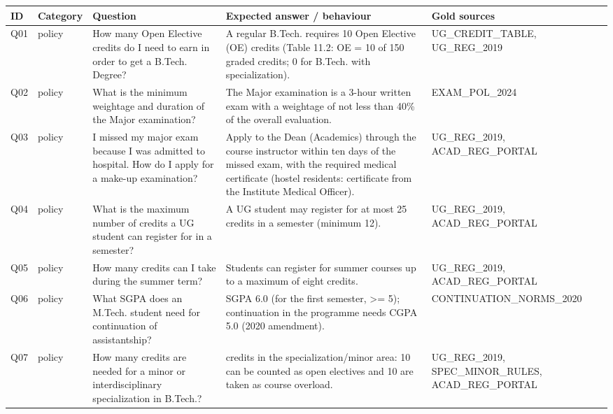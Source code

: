 \begin{small}
\begin{longtable}{>{\raggedright\arraybackslash}p{0.6cm}>{\raggedright\arraybackslash}p{1.4cm}>{\raggedright\arraybackslash}p{4.3cm}>{\raggedright\arraybackslash}p{5.6cm}>{\raggedright\arraybackslash}p{2.3cm}}
\toprule
ID & Category & Question & Expected answer / behaviour & Gold sources \\
\midrule
\endhead
Q01 & policy & How many Open Elective credits do I need to earn in order to get a B.Tech. Degree? & A regular B.Tech. requires 10 Open Elective (OE) credits (Table 11.2: OE = 10 of 150 graded credits; 0 for B.Tech. with specialization). & UG\_\allowbreak{}CREDIT\_\allowbreak{}TABLE, UG\_\allowbreak{}REG\_\allowbreak{}2019 \\
Q02 & policy & What is the minimum weightage and duration of the Major examination? & The Major examination is a 3-hour written exam with a weightage of not less than 40\% of the overall evaluation. & EXAM\_\allowbreak{}POL\_\allowbreak{}2024 \\
Q03 & policy & I missed my major exam because I was admitted to hospital. How do I apply for a make-up examination? & Apply to the Dean (Academics) through the course instructor within ten days of the missed exam, with the required medical certificate (hostel residents: certificate from the Institute Medical Officer). & UG\_\allowbreak{}REG\_\allowbreak{}2019, ACAD\_\allowbreak{}REG\_\allowbreak{}PORTAL \\
Q04 & policy & What is the maximum number of credits a UG student can register for in a semester? & A UG student may register for at most 25 credits in a semester (minimum 12). & UG\_\allowbreak{}REG\_\allowbreak{}2019, ACAD\_\allowbreak{}REG\_\allowbreak{}PORTAL \\
Q05 & policy & How many credits can I take during the summer term? & Students can register for summer courses up to a maximum of eight credits. & UG\_\allowbreak{}REG\_\allowbreak{}2019, ACAD\_\allowbreak{}REG\_\allowbreak{}PORTAL \\
Q06 & policy & What SGPA does an M.Tech. student need for continuation of assistantship? & SGPA 6.0 (for the first semester, >= 5); continuation in the programme needs CGPA 5.0 (2020 amendment). & CONTINUATION\_\allowbreak{}NORMS\_\allowbreak{}2020 \\
Q07 & policy & How many credits are needed for a minor or interdisciplinary specialization in B.Tech.? & 20 credits in the specialization/minor area: 10 can be counted as open electives and 10 are taken as course overload. & UG\_\allowbreak{}REG\_\allowbreak{}2019, SPEC\_\allowbreak{}MINOR\_\allowbreak{}RULES, ACAD\_\allowbreak{}REG\_\allowbreak{}PORTAL \\

\end{longtable}
\end{small}
